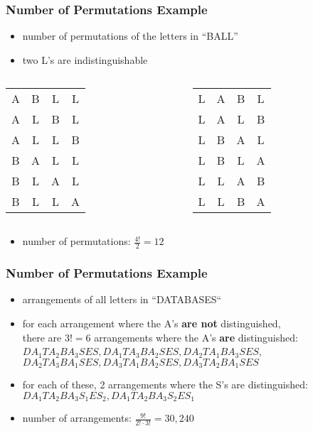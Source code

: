 \documentclass[dvipsnames]{beamer}
\begin{document}
\begin{frame}
  \frametitle{Number of Permutations Example}

  \begin{itemize}
    \item number of permutations of the letters in ``BALL''
    \item two L's are indistinguishable
  \end{itemize}

  \pause
  \begin{columns}[t]
    \begin{tabular}{c c c c}
A & B & L & L\\
A & L & B & L\\
A & L & L & B\\
B & A & L & L\\
B & L & A & L\\
B & L & L & A
    \end{tabular}

    \begin{tabular}{c c c c}
L & A & B & L\\
L & A & L & B\\
L & B & A & L\\
L & B & L & A\\
L & L & A & B\\
L & L & B & A
    \end{tabular}
  \end{columns}

  \pause
  \begin{itemize}
    \item number of permutations: $\frac{4!}{2} = 12$
  \end{itemize}
\end{frame}

\begin{frame}
  \frametitle{Number of Permutations Example}

  \begin{itemize}
    \item arrangements of all letters in ``DATABASES``

    \pause
    \medskip
    \item for each arrangement where the A's \textbf{are not} distinguished,\\
      there are $3! = 6$ arrangements where the A's \textbf{are} distinguished:\\
      \smallskip
      $DA_{1}TA_{2}BA_{3}SES,DA_{1}TA_{3}BA_{2}SES, DA_{2}TA_{1}BA_{3}SES$,\\
      $DA_{2}TA_{3}BA_{1}SES, DA_{3}TA_{1}BA_{2}SES, DA_{3}TA_{2}BA_{1}SES$

    \pause
    \item for each of these, 2 arrangements where the S's are distinguished:\\
      \smallskip
      $DA_{1}TA_{2}BA_{3}S_{1}ES_{2},DA_{1}TA_{2}BA_{3}S_{2}ES_{1}$

    \pause
    \medskip
    \item number of arrangements: $\frac{9!}{2! \cdot 3!} = 30,240$
  \end{itemize}
\end{frame}
\end{document}
